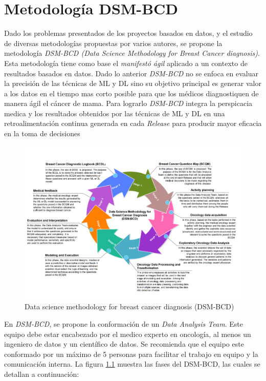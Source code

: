 \chapter{Metodología DSM-BCD}

Dado los problemas presentados de los proyectos basados en datos, y el estudio de diversas metodologías propuestas por varios autores, se propone la metodología \textit{DSM-BCD (Data Science Methodology for Breast Cancer diagnosis)}. Esta metodología tiene como base el \textit{manifestó ágil} aplicado a un contexto de resultados basados en datos. Dado lo anterior \textit{DSM-BCD} no se enfoca en evaluar la precisión de las técnicas de ML y DL sino su objetivo principal es generar valor a los datos en el tiempo mas corto posible para que los médicos diagnostiquen de manera ágil el cáncer de mama. Para lograrlo \textit{DSM-BCD} integra la perspicacia medica y los resultados obtenidos por las técnicas de ML y DL en una retroalimentación continua generada en cada \textit{Release} para producir mayor eficacia en la toma de decisiones

\begin{figure}[!htb]
	\centering
	\includegraphics[width=0.95
	\linewidth]{IMAGENES/DSM-BCD.pdf}
	\caption{Data science methodology for breast cancer diagnosis (DSM-BCD)}
	\label{DSM-BCD}
\end{figure}

 En \textit{DSM-BCD}, se propone la conformación de un \textit{Data Analysis Team}. Este equipo debe estar encabezado por el medico experto en oncología, al menos un ingeniero de datos y un científico de datos. Se recomienda que el equipo este conformado por un máximo de 5 personas para facilitar el trabajo en equipo y la comunicación interna. La figura \ref{DSM-BCD} muestra las fases del DSM-BCD, las cuales se detallan a continuación:

